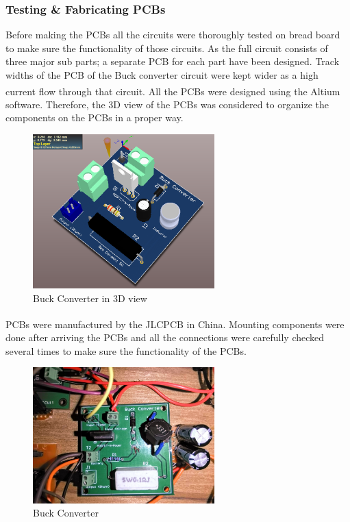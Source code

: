 \documentclass[a4paper,12pt]{article}
\begin{document}
\begin{multicols}{2}
\subsubsection{Testing \& Fabricating PCBs}
Before making the PCBs all the circuits were thoroughly tested on bread board to make sure the functionality of those circuits. As the full circuit consists of three major sub parts; a separate PCB for each part have been designed. Track widths of the PCB of the Buck converter circuit were kept wider as a high current flow through that circuit. All the PCBs were designed using the Altium\textsuperscript{\textregistered} software. Therefore, the 3D view of the PCBs was considered to organize the components on the PCBs in a proper way.
\begin{figure}[H]
    \centering
    \includegraphics[width=7cm]{Fig_01.png}
    \caption{Buck Converter in 3D view}
    \label{fig:Buck Converter in 3D view}
\end{figure}
PCBs were manufactured by the JLCPCB\textsuperscript{\textregistered} in China. Mounting components were done after arriving the PCBs and all the connections were carefully checked several times to make sure the functionality of the PCBs.
\begin{figure}[H]
    \centering
    \includegraphics[width=7cm]{Fig_02.jpeg}
    \caption{Buck Converter}
    \label{fig:PWM signal Generator}
\end{figure}
\begin{figure}[H]

\end{figure}
\end{multicols}
\end{document}
